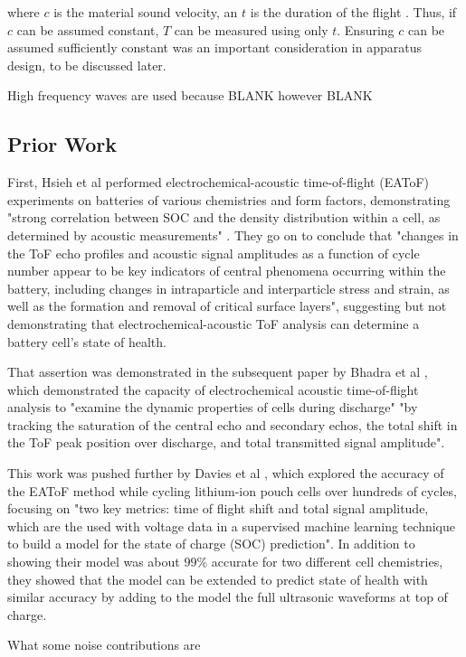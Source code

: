 where $c$ is the material sound velocity, an $t$ is the duration of the flight \cite{OLYMPUS}. Thus, if $c$ can be assumed constant, $T$ can be measured using only $t$. Ensuring $c$ can be assumed sufficiently constant was an important consideration in apparatus design, to be discussed later.

High frequency waves are used because BLANK however BLANK

\subsection{Prior Work}

First, Hsieh et al  performed electrochemical-acoustic time-of-flight (EAToF) experiments on batteries of various chemistries and form factors, demonstrating "strong correlation between SOC and the density distribution within a cell, as determined by acoustic measurements" \cite{TOF-STATE}. They go on to conclude that "changes in the ToF echo profiles and acoustic signal amplitudes as a function of cycle number appear to be key indicators of central phenomena occurring within the battery, including changes in intraparticle and interparticle stress and strain, as well as the formation and removal of critical surface layers", suggesting but not demonstrating that electrochemical-acoustic ToF analysis can determine a battery cell's state of health.

That assertion was demonstrated in the subsequent paper by Bhadra et al  \cite{ANODE-CHAR}, which demonstrated the capacity of electrochemical acoustic time-of-flight analysis to "examine the dynamic properties of cells during discharge" "by tracking the saturation of the central echo and secondary echos, the total shift in the ToF peak position over discharge, and total transmitted signal amplitude".

This work was pushed further by Davies et al  \cite{SOC-SOH-EST}, which explored the accuracy of the EAToF method while cycling lithium-ion pouch cells over hundreds of cycles, focusing on "two key metrics: time of flight shift and total signal amplitude, which are the used with voltage data in a supervised machine learning technique to build a model for the state of charge (SOC) prediction". In addition to showing their model was about $99\%$ accurate for two different cell chemistries, they showed that the model can be extended to predict state of health with similar accuracy by adding to the model the full ultrasonic waveforms at top of charge.



What some noise contributions are